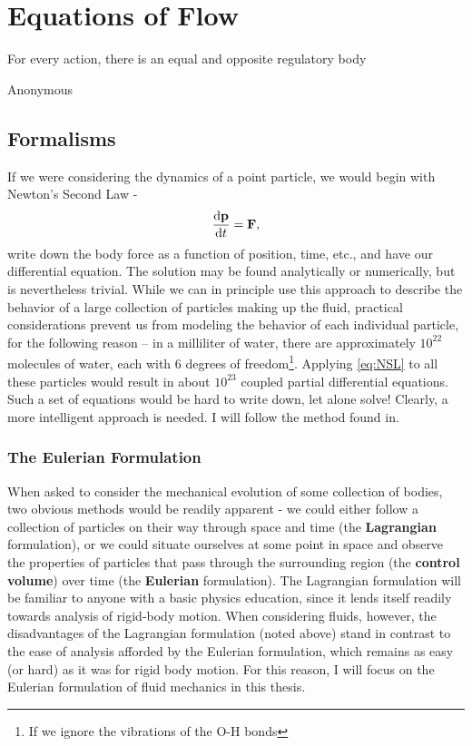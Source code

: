 \setcounter{secnumdepth}{3}
\chapter{Equations of Flow}
    	 	\epigraph{For every action, there is an equal and opposite regulatory body}{Anonymous}
\section{Formalisms}
If we were considering the dynamics of a point particle, we would begin with Newton's Second Law - 
\begin{equation}\label{eq:NSL}
\der{1}{\Vector{p}}{t} = \Vector{F}, 
\end{equation}
write down the body force as a function of position, time, etc., and have our differential equation. The solution may be found analytically or numerically, but is nevertheless trivial. While we can in principle use this approach to describe the behavior of a large collection of particles making up the fluid, practical considerations prevent us from modeling the behavior of each individual particle, for the following reason -- in a milliliter of water, there are approximately $10^{22}$ molecules of water, each with 6 degrees of freedom\footnote{If we ignore the vibrations of the O-H bonds}. Applying \eqref{eq:NSL} to all these particles would result in about $10^{23}$ coupled partial differential equations. Such a set of equations would be hard to write down, let alone solve! Clearly, a more intelligent approach is needed. I will follow the method found in. \\

\subsection{The Eulerian Formulation}

When asked to consider the mechanical evolution of some collection of bodies, two obvious methods would be readily apparent - we could either follow a collection of particles on their way through space and time (the {\bf Lagrangian} formulation), or we could situate ourselves at some point in space and observe the properties of particles that pass through the surrounding region (the {\bf control volume}) over time (the {\bf Eulerian} formulation). The Lagrangian formulation will be familiar to anyone with a basic physics education, since it lends itself readily towards analysis of rigid-body motion. When considering fluids, however, the disadvantages of the Lagrangian formulation (noted above) stand in contrast to the ease of analysis afforded by the Eulerian formulation, which remains as easy (or hard) as it was for rigid body motion. For this reason, I will focus on the Eulerian formulation of fluid mechanics in this thesis. 

